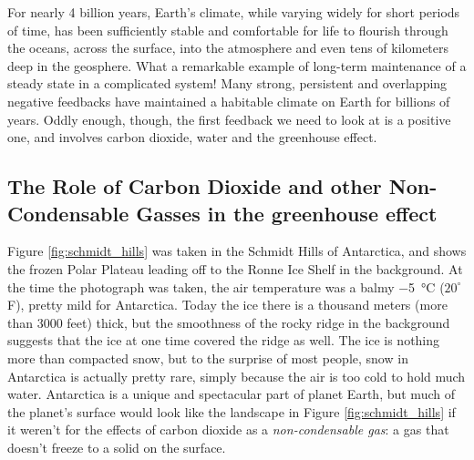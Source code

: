 \documentclass[amstex,12pt]{book}
\begin{document}
For nearly 4 billion years, Earth's climate, while varying widely for short periods of time, has been sufficiently stable and comfortable for life to flourish through the oceans, across the surface, into the atmosphere and even tens of kilometers deep in the geosphere. What a remarkable example of long-term maintenance of a steady state in a complicated system! Many strong, persistent and overlapping negative feedbacks have maintained a habitable climate on Earth for billions of years. Oddly enough, though, the first feedback we need to look at is a positive one, and involves carbon dioxide, water and the greenhouse effect.

\subsection{The Role of Carbon Dioxide and other Non-Condensable Gasses in the greenhouse effect}
Figure \ref{fig:schmidt_hills} was taken in the Schmidt Hills of Antarctica, and shows the frozen Polar Plateau leading off to the Ronne Ice Shelf in the background. At the time the photograph was taken, the air temperature was a balmy \SI{-5}{\celsius} ($20^{\circ}$ F), pretty mild for Antarctica. Today the ice there is a thousand meters (more than 3000 feet) thick, but the smoothness of the rocky ridge in the background suggests that the ice at one time covered the ridge as well. The ice is nothing more than compacted snow, but to the surprise of most people, snow in Antarctica is actually pretty rare, simply because the air is too cold to hold much water. Antarctica is a unique and spectacular part of planet Earth, but much of the planet's surface would look like the landscape in Figure \ref{fig:schmidt_hills} if it weren't for the effects of carbon dioxide as a \emph{non-condensable gas}: a gas that doesn't freeze to a solid on the surface. 
\end{document}

